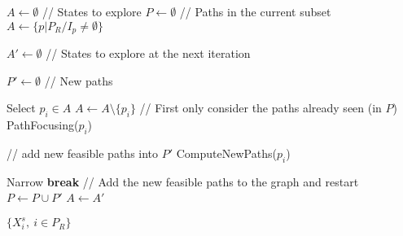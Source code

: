 \STATE $A \gets \emptyset$ // States to explore
\STATE $P \gets \emptyset$ // Paths in the current subset
\STATE $A \gets \{p | P_R / I_p \neq \emptyset\}$

\STATE $A' \gets \emptyset$ // States to explore at the next iteration

\STATE $P' \gets \emptyset$ // New paths

 \label{alg=start-ascending}
	\STATE Select $p_i \in A$
	\STATE $A \gets A \setminus \{p_i\}$
	\STATE // First only consider the paths already seen (in $P$)
	\STATE PathFocusing($p_i$) \label{alg=pf}
	
	\STATE // add new feasible paths into $P'$
	\STATE ComputeNewPaths($p_i$) \label{alg=computeNewPaths}

\ENDWHILE \label{alg=end-ascending}
\STATE Narrow \label{alg=narrowing}
	\STATE \textbf{break}
\ENDIF 
\STATE // Add the new feasible paths to the graph and restart  \label{alg=start-add-paths}
\STATE $P \gets P \cup P'$
\STATE $A \gets A'$ \label{alg=end-add-paths}
\ENDWHILE

\STATE \RETURN $\{X_i^s,\ i \in P_R\}$

